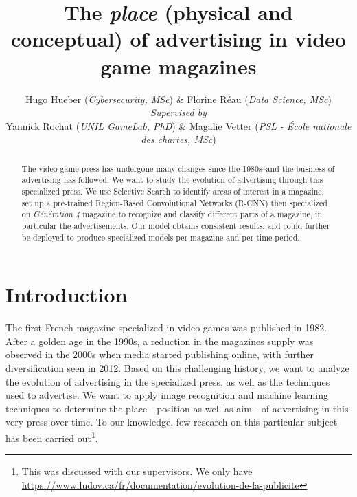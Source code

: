 \documentclass[10pt,conference,compsocconf]{IEEEtran}
\begin{document}
\title{The \textit{place} (physical and conceptual) of advertising in video game magazines}
\author{
  Hugo Hueber (\textit{Cybersecurity, MSc}) \& Florine Réau (\textit{Data Science, MSc})\\
  \textit{Supervised by}\\Yannick Rochat (\textit{UNIL GameLab, PhD}) \& Magalie Vetter (\textit{PSL - École nationale des chartes, MSc})
}

\maketitle

\begin{abstract}
  The video game press has undergone many changes since the 1980s–and the business of advertising has followed. We want to study the evolution of advertising through this specialized press. We use Selective Search to identify areas of interest in a magazine, set up a pre-trained Region-Based Convolutional Networks (R-CNN) then specialized on \textit{Génération 4} magazine to recognize and classify different parts of a magazine, in particular the advertisements. Our model obtains consistent results, and could further be deployed to produce specialized models per magazine and per time period.
\end{abstract}

\section{Introduction}
The first French magazine specialized in video games was published in 1982. After a golden age in the 1990s, a reduction in the magazines supply was observed in the 2000s when media started publishing online, with further diversification seen in 2012\cite{claireblandin2018}. Based on this challenging history, we want to analyze the evolution of advertising in the specialized press, as well as the techniques used to advertise. We want to apply image recognition and machine learning techniques to determine the place - position as well as aim - of advertising in this very press over time. To our knowledge, few research on this particular subject has been carried out\footnote{This was discussed with our supervisors. We only have \url{https://www.ludov.ca/fr/documentation/evolution-de-la-publicite}}.
\end{document}

